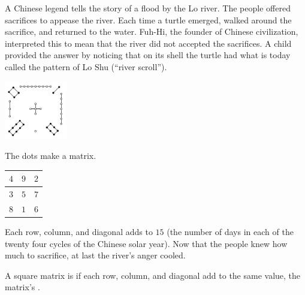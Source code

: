 A Chinese legend tells the story of a  
flood by the Lo river.
The people offered sacrifices to appease the river.
Each time a turtle emerged, 
walked around the sacrifice, and returned to the water.
Fuh-Hi, %
the founder of Chinese civilization,
interpreted this to mean that
the river did not accepted the sacrifices.  
A child provided the answer by noticing 
that on its shell the turtle had what is today
called the pattern of Lo Shu (``river scroll'').
\begin{center}
  \includegraphics[height=1in]{LoShu.png}
\end{center}
The dots make a matrix.
\begin{center}
  \begin{tabular}{|c|c|c|}
    \hline
      $4$  &$9$  &$2$  \\ \hline
      $3$  &$5$  &$7$  \\ \hline
      $8$  &$1$  &$6$  \\ \hline    
  \end{tabular}
\end{center}
Each row, column, 
and diagonal adds to $15$
(the number of days in each of the twenty four cycles of the 
Chinese solar year).
Now that the people knew how much to sacrifice, at last the river's anger cooled.

A square matrix is 
if each row, column, and diagonal add to the same
value, the matrix's .

